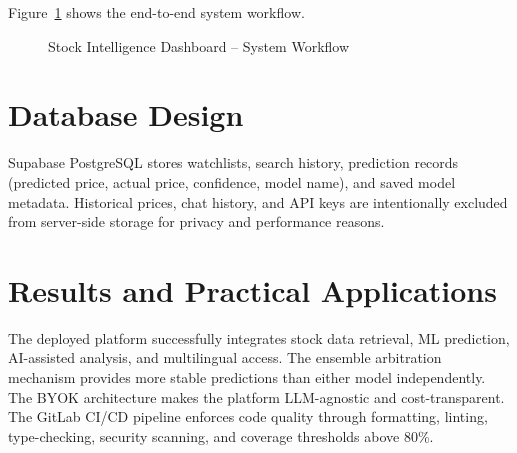 \documentclass{book}
\begin{document}
\par\noindent Figure~\ref{fig:stock_flow} shows the end-to-end system workflow.

\begin{figure}[ht]
\centering
{}
\caption{Stock Intelligence Dashboard -- System Workflow}
\label{fig:stock_flow}
\end{figure}

\section{Database Design}

\par\noindent Supabase PostgreSQL stores watchlists, search history, prediction records (predicted price, actual price, confidence, model name), and saved model metadata. Historical prices, chat history, and API keys are intentionally excluded from server-side storage for privacy and performance reasons.

\section{Results and Practical Applications}

\par\noindent The deployed platform successfully integrates stock data retrieval, ML prediction, AI-assisted analysis, and multilingual access. The ensemble arbitration mechanism provides more stable predictions than either model independently. The BYOK architecture makes the platform LLM-agnostic and cost-transparent. The GitLab CI/CD pipeline enforces code quality through formatting, linting, type-checking, security scanning, and coverage thresholds above 80\%.
\end{document}
